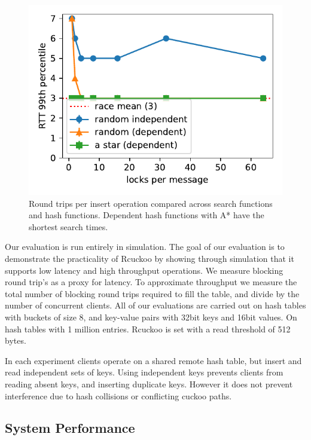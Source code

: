 \begin{figure}[ht]
    \includegraphics[width=0.99\linewidth]{fig/search_dependence.pdf}

    \caption{Round trips per insert operation compared
    across search functions and hash functions. Dependent
    hash functions with A* have the shortest search times.}

    \label{fig:search_dependence}
\end{figure}

Our evaluation is run entirely in simulation. The goal of
our evaluation is to demonstrate the practicality of Rcuckoo
by showing through simulation that it supports low latency
and high throughput operations. We measure blocking round
trip's as a proxy for latency.  To approximate throughput we
measure the total number of blocking round trips required to
fill the table, and divide by the number of concurrent
clients.  All of our evaluations are carried out on hash
tables with buckets of size 8, and key-value pairs with
32bit keys and 16bit values. On hash tables with 1 million
entries. Rcuckoo is set with a read threshold of 512 bytes.

In each experiment clients operate on a shared remote hash
table, but insert and read independent sets of keys. Using
independent keys prevents clients from reading absent keys,
and inserting duplicate keys.  However it does not prevent
interference due to hash collisions or conflicting cuckoo
paths.


\subsection{System Performance}

